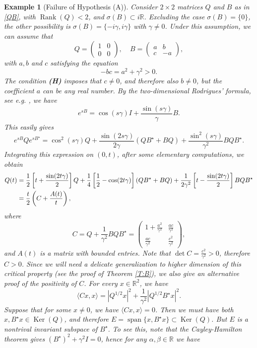\documentclass[11pt,letter]{amsart}
\def \R {\mathbb{R}}
\numberwithin{equation}{section}
\newcommand{\sa}{\langle}
\newcommand{\da}{\rangle}
\newtheorem{example}[theorem]{Example}
\numberwithin{equation}{section}
\begin{document}
\begin{example}[Failure of Hypothesis (A)]\label{E:imspec} \textnormal{Consider $2\times 2$ matrices $Q$ and $B$ as in \eqref{QB}, with $\operatorname{Rank}(Q)<2$, and $\sigma(B) \subset i \R$. Excluding the case $\sigma(B) = \{0\}$, the other possibility is $\sigma(B) = \{-i\gamma,i\gamma\}$ with $\gamma\not= 0$. Under this assumption, we can assume that
\[
Q = \begin{pmatrix} 1 & 0\\ 0 & 0\end{pmatrix},\ \ \ \ \ B = \begin{pmatrix} a & b\\ c & -a\end{pmatrix}, 
\]
with $a, b$ and $c$ satisfying the equation
\[
- bc = a^2 + \gamma^2 > 0.
\] 
The condition \textbf{(H)} imposes that $c\not= 0$, and therefore also $b\not= 0$, but the coefficient $a$ can be any real number. By the two-dimensional Rodrigues' formula, see e.g. \cite[Prop.11.3.2]{Bernie}, we have
\[
e^{sB} = \cos(s\gamma) I + \frac{\sin(s\gamma)}{\gamma} B.
\]
This easily gives
\[
e^{sB} Q e^{sB^\star} = \cos^2(s\gamma) Q + \frac{\sin(2s\gamma)}{2\gamma} (QB^\star + B Q) + \frac{\sin^2(s\gamma)}{\gamma^2} BQB^\star.
\]
Integrating this expression on $(0,t)$, after some elementary computations, we obtain
\begin{align}\label{2Vt}
Q(t) & = \frac 12 \left[t + \frac{\sin(2t\gamma)}2\right] Q + \frac 14\left[\frac 12 - \cos(2t\gamma)\right](QB^\star + B Q) + \frac 1{2\gamma^2} \left[t - \frac{\sin(2t\gamma)}2\right] BQB^\star
\\
& =  \frac t2 \left(C + \frac{A(t)}t\right),
\notag
\end{align}
where 
\begin{equation}\label{C}
C = Q + \frac 1{\gamma^2}BQB^\star 
= \begin{pmatrix} 1+\frac{a^2}{\gamma^2} & \frac{ac}{\gamma^2}\\ \frac{ac}{\gamma^2} & \frac{c^2}{\gamma^2}\end{pmatrix},
\end{equation}
and $A(t)$ is a matrix with bounded entries. Note that $\det C = \frac{c^2}{\gamma^2}>0$, therefore $C>0$. Since we will need a delicate generalization to higher dimension of this critical property  (see the proof of Theorem \ref{T:B}), we also give an alternative proof of the positivity of $C$. For every $x\in \R^2$, we have
\[
\sa Cx,x\da = |Q^{1/2}x|^2 + \frac 1{\gamma^2} |Q^{1/2} B^\star x|^2.
\]
Suppose that for some $x\not= 0$, we have $\sa Cx,x\da=0$. Then we must have both $x, B^\star x\in \operatorname{Ker}(Q)$, and therefore $E = \operatorname{span}\{x,B^\star x\} \subset \operatorname{Ker}(Q)$. But $E$ is a nontrival invariant subspace of $B^\star$. To see this, note that the Cayley-Hamilton theorem gives $(B^\star)^2 + \gamma^2 I = 0$, hence for any $\alpha, \beta \in \R$ we have 
}
\end{example}
\end{document}
